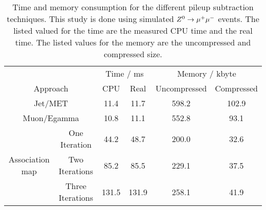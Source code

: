 
\begin{table}[h]
    \begin{center}
        \caption{Time and memory consumption for the different pileup subtraction techniques. This study is done using simulated ${Z^{0}}\rightarrow\mu^+\mu^-$ events. The listed valued for the time are the measured CPU time and the real time. The listed values for the memory are the uncompressed and compressed size.}
        \label{tab:OSPTimMemZMM}
        
        \begin{tabular}{c c c c c c}
            & & \multicolumn{2}{c}{Time / ms} & \multicolumn{2}{c}{Memory / kbyte}  \\
            \multicolumn{2}{c}{Approach} & CPU & Real & Uncompressed & Compressed \\
            \midrule[2pt]
            \multicolumn{2}{c}{Jet/MET}  & 11.4 & 11.7 &  598.2 & 102.9 \\
            \midrule
            \multicolumn{2}{c}{Muon/Egamma}  & 10.8 & 11.1 & 552.8 & 93.1 \\
            \midrule
            \multirow{3}{*}{Association map}
            & One Iteration & 44.2 & 48.7 & 200.0 & 32.6 \\
            \cmidrule{2-6}
            & Two Iterations & 85.2 & 85.5 & 229.1 & 37.5 \\
            \cmidrule{2-6}
            & Three Iterations  & 131.5 & 131.9 & 258.1 & 41.9 \\
            
        \end{tabular}
        
    \end{center}
\end{table}